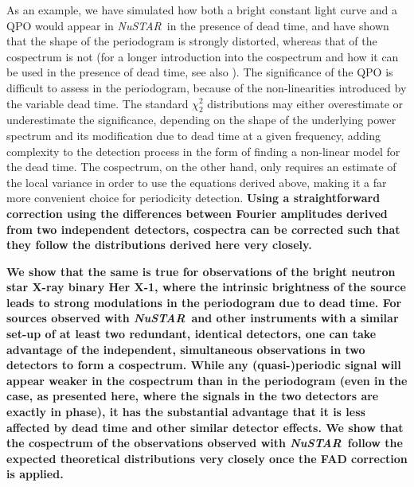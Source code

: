 \documentclass[12pt]{emulateapj}
\newcommand{\project}[1]{\textsl{#1}}
\newcommand{\nustar}{\project{NuSTAR}\xspace}
\begin{document}
As an example, we have simulated how both a bright constant light curve and a QPO would appear in \nustar\ in the presence of dead time, and have shown that the shape of the periodogram is strongly distorted, whereas that of the cospectrum is not (for a longer introduction into the cospectrum and how it can be used in the presence of dead time, see also \citealt{Bachetti+15}). The significance of the QPO is difficult to assess in the periodogram, because of the non-linearities introduced by the variable dead time. The standard $\chi^2_2$ distributions may either overestimate or underestimate the significance, depending on the shape of the underlying power spectrum and its modification due to dead time at a given frequency, adding complexity to the detection process in the form of finding a non-linear model for the dead time. The cospectrum, on the other hand, only requires an estimate of the local variance in order to use the equations derived above, making it a far more convenient choice for periodicity detection. \textbf{Using a straightforward correction using the differences between Fourier amplitudes derived from two independent detectors, cospectra can be corrected such that they follow the distributions derived here very closely.}

\textbf{We show that the same is true for observations of the bright neutron star X-ray binary Her X-1, where the intrinsic brightness of the source leads to strong modulations in the periodogram due to dead time. For sources observed with \nustar\ and other instruments with a similar set-up of at least two redundant, identical detectors, one can take advantage of the independent, simultaneous observations in two detectors to form a cospectrum. While any (quasi-)periodic signal will appear weaker in the cospectrum than in the periodogram (even in the case, as presented here, where the signals in the two detectors are exactly in phase), it has the substantial advantage that it is less affected by dead time and other similar detector effects. We show that the cospectrum of the observations observed with \nustar\ follow the expected theoretical distributions very closely once the FAD correction is applied.}
\end{document}
